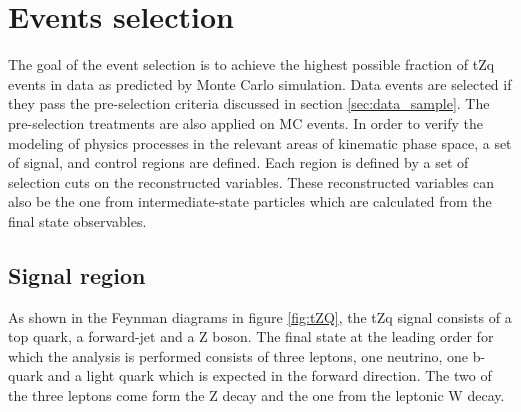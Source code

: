 
\chapter{Events selection}
\label{chap:event_selection}

The goal of the event selection is to achieve the highest possible fraction of tZq events in data as predicted by Monte Carlo simulation. Data events are selected if they pass the pre-selection criteria discussed in section \ref{sec:data_sample}. The pre-selection treatments are also applied on MC events. In order to verify the modeling of physics processes in the relevant areas of kinematic phase space, a set of signal, and control regions are defined. Each region is defined by a set of selection cuts on the reconstructed variables. These reconstructed variables can also be the one from intermediate-state particles which are calculated from the final state observables. 

\section{Signal region}
\label{sec:SR}

As shown in the Feynman diagrams in figure \ref{fig:tZQ}, the tZq signal consists of a top quark, a forward-jet and a Z boson. The final state at the leading order for which the analysis is performed consists of three leptons, one neutrino, one b-quark and a light quark which is expected in the forward direction.  The two of the three leptons come form the Z decay and the one from the leptonic W decay. 

